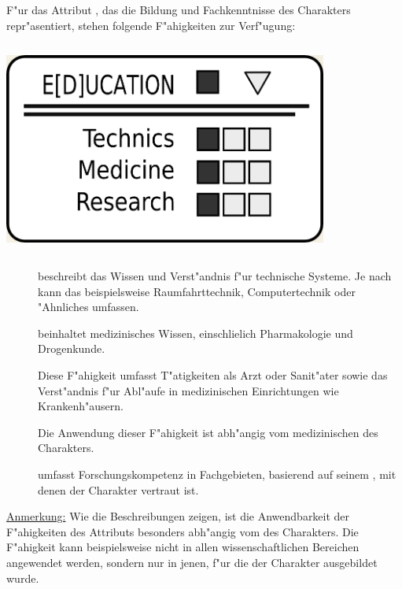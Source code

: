 \medskip
\begin{column}[l]{0.55}
    F"ur das Attribut , das die Bildung und Fachkenntnisse des Charakters repr"asentiert, stehen folgende F"ahigkeiten zur Verf"ugung:

\end{column}
\begin{column}[r]{0.45}
    \centering
    \includegraphics[width=0.80\textwidth]{images/character_education.jpg}
\end{column}

\begin{description}
    \item[]  beschreibt das Wissen und Verst"andnis f"ur technische Systeme. Je nach  kann das beispielsweise Raumfahrttechnik, Computertechnik oder "Ahnliches umfassen.
    \item[]  beinhaltet medizinisches Wissen, einschlie\3lich Pharmakologie und Drogenkunde. 
    
        Diese F"ahigkeit umfasst T"atigkeiten als Arzt oder Sanit"ater sowie das Verst"andnis f"ur Abl"aufe in medizinischen Einrichtungen wie Krankenh"ausern. 
        
        Die Anwendung dieser F"ahigkeit ist abh"angig vom medizinischen  des Charakters.
    \item[]  umfasst Forschungskompetenz in Fachgebieten, basierend auf seinem , mit denen 
        der Charakter vertraut ist.
\end{description}

\underline{Anmerkung:} Wie die Beschreibungen zeigen, ist die Anwendbarkeit der F"ahigkeiten des Attributs  besonders abh"angig vom  des Charakters. Die F"ahigkeit  kann beispielsweise nicht in allen wissenschaftlichen Bereichen angewendet werden, sondern nur in jenen, f"ur die der Charakter ausgebildet wurde.

